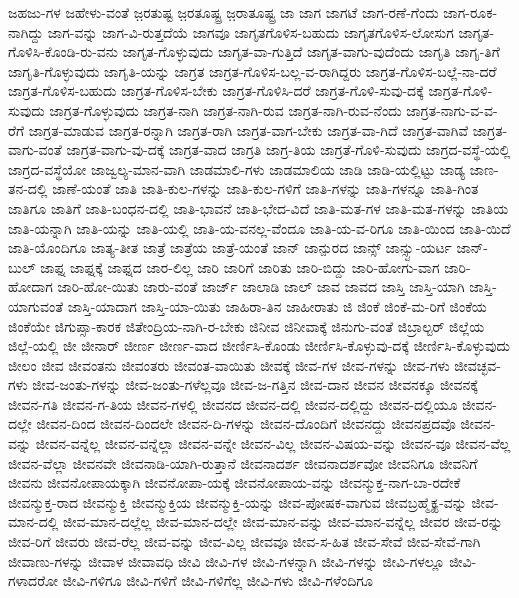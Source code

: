 {ಜಹಜು-ಗಳ
ಜಹೇಳು-ವಂತೆ
ಜ಼ರತುಷ್ಟ
ಜ಼ರತೂಷ್ಟ್ರ
ಜ಼ರಾತೂಷ್ಟ್ರ
ಜಾ
ಜಾಗ
ಜಾಗಟೆ
ಜಾಗ-ರಣೆ-ಗೆಂದು
ಜಾಗ-ರೂಕ-ನಾಗಿದ್ದು
ಜಾಗ-ವನ್ನು
ಜಾಗ-ವಿ-ರುತ್ತದೆಯೆ
ಜಾಗವೂ
ಜಾಗೃತಗೊಳಿಸ-ಬಹುದು
ಜಾಗೃತಗೊಳಿಸ-ಲೋಸುಗ
ಜಾಗೃತ-ಗೊಳಿಸಿ-ಕೊಂಡಿ-ರು-ವನು
ಜಾಗೃತ-ಗೊಳ್ಳುವುದು
ಜಾಗೃತ-ವಾ-ಗುತ್ತಿದೆ
ಜಾಗೃತ-ವಾಗು-ವುದೆಂದು
ಜಾಗೃತಿ
ಜಾಗೃ-ತಿಗೆ
ಜಾಗೃತಿ-ಗೊಳ್ಳುವುದು
ಜಾಗೃತಿ-ಯನ್ನು
ಜಾಗ್ರತ
ಜಾಗ್ರತ-ಗೊಳಿಸ-ಬಲ್ಲ-ವ-ರಾಗಿದ್ದರು
ಜಾಗ್ರತ-ಗೊಳಿಸ-ಬಲ್ಲೆ-ನಾ-ದರೆ
ಜಾಗ್ರತ-ಗೊಳಿಸ-ಬಹುದು
ಜಾಗ್ರತ-ಗೊಳಿಸ-ಬೇಕು
ಜಾಗ್ರತ-ಗೊಳಿಸಿ-ದರೆ
ಜಾಗ್ರತ-ಗೊಳಿ-ಸುವು-ದಕ್ಕೆ
ಜಾಗ್ರತ-ಗೊಳಿ-ಸುವುದು
ಜಾಗ್ರತ-ಗೊಳ್ಳುವುದು
ಜಾಗ್ರತ-ನಾಗಿ
ಜಾಗ್ರತ-ನಾಗಿ-ರುವ
ಜಾಗ್ರತ-ನಾಗಿ-ರುವ-ನೆಂದು
ಜಾಗ್ರತ-ನಾಗು-ವ-ವ-ರೆಗೆ
ಜಾಗ್ರತ-ಮಾಡುವ
ಜಾಗ್ರತ-ರನ್ನಾಗಿ
ಜಾಗ್ರತ-ರಾಗಿ
ಜಾಗ್ರತ-ವಾಗ-ಬೇಕು
ಜಾಗ್ರತ-ವಾ-ಗಿದೆ
ಜಾಗ್ರತ-ವಾಗಿವೆ
ಜಾಗ್ರತ-ವಾಗು-ವಂತೆ
ಜಾಗ್ರತ-ವಾಗು-ವು-ದಕ್ಕೆ
ಜಾಗ್ರತ-ವಾದ
ಜಾಗ್ರತಿ
ಜಾಗ್ರ-ತಿಯ
ಜಾಗ್ರತೆ-ಗೊಳಿ-ಸುವುದು
ಜಾಗ್ರದ-ವಸ್ಥೆ-ಯಲ್ಲಿ
ಜಾಗ್ರದ-ವಸ್ಥೆಯೋ
ಜಾಜ್ವಲ್ಯ-ಮಾನ-ವಾಗಿ
ಜಾಡಮಾಲಿ-ಗಳು
ಜಾಡಮಾಲಿಯ
ಜಾಡಿ
ಜಾಡಿ-ಯಲ್ಲಿಟ್ಟು
ಜಾಡ್ಯ
ಜಾಣ-ತನ-ದಲ್ಲಿ
ಜಾಣೆ-ಯಂತೆ
ಜಾತಿ
ಜಾತಿ-ಕುಲ-ಗಳನ್ನು
ಜಾತಿ-ಕುಲ-ಗಳಿಗೆ
ಜಾತಿ-ಗಳನ್ನು
ಜಾತಿ-ಗಳನ್ನೂ
ಜಾತಿ-ಗಿಂತ
ಜಾತಿಗೂ
ಜಾತಿಗೆ
ಜಾತಿ-ಬಂಧನ-ದಲ್ಲಿ
ಜಾತಿ-ಭಾವನೆ
ಜಾತಿ-ಭೇದ-ವಿದೆ
ಜಾತಿ-ಮತ-ಗಳ
ಜಾತಿ-ಮತ-ಗಳನ್ನು
ಜಾತಿಯ
ಜಾತಿ-ಯನ್ನಾಗಿ
ಜಾತಿ-ಯನ್ನು
ಜಾತಿ-ಯಲ್ಲಿ
ಜಾತಿ-ಯ-ವನಲ್ಲ-ವೆಂದೂ
ಜಾತಿ-ಯ-ವ-ರಿಗೂ
ಜಾತಿ-ಯಿಂದ
ಜಾತಿ-ಯಿದೆ
ಜಾತಿ-ಯೊಂದಿಗೂ
ಜಾತ್ಯ-ತೀತ
ಜಾತ್ರೆ
ಜಾತ್ರೆಯ
ಜಾತ್ರೆ-ಯಂತೆ
ಜಾನ್
ಜಾನ್ಪುರದ
ಜಾನ್ಸ್
ಜಾನ್ಸ್ಟು-ಯರ್ಟ
ಜಾನ್-ಬುಲ್
ಜಾಫ್ನ
ಜಾಫ್ನಕ್ಕೆ
ಜಾಫ್ನದ
ಜಾರ-ಲಿಲ್ಲ
ಜಾರಿ
ಜಾರಿಗೆ
ಜಾರಿತು
ಜಾರಿ-ಬಿದ್ದು
ಜಾರಿ-ಹೋಗು-ವಾಗ
ಜಾರಿ-ಹೋದಾಗ
ಜಾರಿ-ಹೋ-ಯಿತು
ಜಾರು-ವಂತೆ
ಜಾರ್ಜ್
ಜಾಲಾಡಿ
ಜಾಲ್
ಜಾವ
ಜಾವದ
ಜಾಸ್ತಿ
ಜಾಸ್ತಿ-ಯಾಗಿ
ಜಾಸ್ತಿ-ಯಾಗುವಂತೆ
ಜಾಸ್ತಿ-ಯಾದಾಗ
ಜಾಸ್ತಿ-ಯಾ-ಯಿತು
ಜಾಹಿರಾ-ತಿನ
ಜಾಹೀರಾತು
ಜಿ
ಜಿಂಕೆ
ಜಿಂಕೆ-ಮ-ರಿಗೆ
ಜಿಂಕೆಯ
ಜಿಂಕೆಯೇ
ಜಿಗುಪ್ಸಾ-ಕಾರಕ
ಜಿತೇಂದ್ರಿಯ-ನಾಗಿ-ರ-ಬೇಕು
ಜಿನೀವ
ಜಿನೀವಾಕ್ಕೆ
ಜಿನುಗು-ವಂತೆ
ಜಿಬ್ರಾಲ್ಟರ್
ಜಿಲ್ಲೆಯ
ಜಿಲ್ಲೆ-ಯಲ್ಲಿ
ಜೀ
ಜೀನಾರ್
ಜೀರ್ಣ
ಜೀರ್ಣ-ವಾದ
ಜೀರ್ಣಿಸಿ-ಕೊಂಡು
ಜೀರ್ಣಿಸಿ-ಕೊಳ್ಳುವು-ದಕ್ಕೆ
ಜೀರ್ಣಿಸಿ-ಕೊಳ್ಳುವುದು
ಜೀಲಂ
ಜೀವ
ಜೀವಂತನು
ಜೀವಂತರು
ಜೀವಂತ-ವಾಯಿತು
ಜೀವಕ್ಕೆ
ಜೀವ-ಗಳ
ಜೀವ-ಗಳನ್ನು
ಜೀವ-ಗಳು
ಜೀವಚ್ಛವ-ಗಳು
ಜೀವ-ಜಂತು-ಗಳನ್ನು
ಜೀವ-ಜಂತು-ಗಳೆಲ್ಲವೂ
ಜೀವ-ಜ-ಗತ್ತಿನ
ಜೀವ-ದಾನ
ಜೀವನ
ಜೀವನಕ್ಕೂ
ಜೀವನಕ್ಕೆ
ಜೀವನ-ಗತಿ
ಜೀವನ-ಗ-ತಿಯ
ಜೀವನ-ಗಳಲ್ಲಿ
ಜೀವನದ
ಜೀವನ-ದಲ್ಲಿ
ಜೀವನ-ದಲ್ಲಿದ್ದು
ಜೀವನ-ದಲ್ಲಿಯೂ
ಜೀವನ-ದಲ್ಲೇ
ಜೀವನ-ದಿಂದ
ಜೀವನ-ದಿಂದಲೇ
ಜೀವನ-ದಿ-ಗಳನ್ನು
ಜೀವನ-ದೊಂದಿಗೆ
ಜೀವನದ್ದು
ಜೀವನಪ್ರದವೊ
ಜೀವನ-ವನ್ನು
ಜೀವನ-ವನ್ನೆಲ್ಲ
ಜೀವನ-ವನ್ನೆಲ್ಲಾ
ಜೀವನ-ವನ್ನೇ
ಜೀವನ-ವಿಲ್ಲ
ಜೀವನ-ವಿಷಯ-ವನ್ನು
ಜೀವನ-ವೂ
ಜೀವನ-ವೆಲ್ಲ
ಜೀವನ-ವೆಲ್ಲಾ
ಜೀವನವೇ
ಜೀವನಾಡಿ-ಯಾಗಿ-ರುತ್ತಾನೆ
ಜೀವನಾದರ್ಶ
ಜೀವನಾದರ್ಶವೋ
ಜೀವನಿಗೂ
ಜೀವನಿಗೆ
ಜೀವನು
ಜೀವನೋಪಾಯಕ್ಕಾಗಿ
ಜೀವನೋಪಾ-ಯಕ್ಕೆ
ಜೀವನೋಪಾಯ-ವನ್ನು
ಜೀವನ್ಮುಕ್ತ-ನಾಗ-ಬಾ-ರದೇಕೆ
ಜೀವನ್ಮುಕ್ತ-ರಾದ
ಜೀವನ್ಮುಕ್ತಿ
ಜೀವನ್ಮುಕ್ತಿಯ
ಜೀವನ್ಮುಕ್ತಿ-ಯನ್ನು
ಜೀವ-ಪೋಷಕ-ವಾಗುವ
ಜೀವಬ್ರಹ್ಮೈಕ್ಯ-ವನ್ನು
ಜೀವ-ಮಾನ-ದಲ್ಲಿ
ಜೀವ-ಮಾನ-ದಲ್ಲೆಲ್ಲ
ಜೀವ-ಮಾನ-ದಲ್ಲೇ
ಜೀವ-ಮಾನ-ವನ್ನು
ಜೀವ-ಮಾನ-ವನ್ನೆಲ್ಲ
ಜೀವರ
ಜೀವ-ರನ್ನು
ಜೀವ-ರಿಗೆ
ಜೀವರು
ಜೀವ-ರೆಲ್ಲ
ಜೀವ-ವನ್ನು
ಜೀವ-ವಿಲ್ಲ
ಜೀವವೂ
ಜೀವ-ಸ-ಹಿತ
ಜೀವ-ಸೇವೆ
ಜೀವ-ಸೇವೆ-ಗಾಗಿ
ಜೀವಾಣು-ಗಳನ್ನು
ಜೀವಾಳ
ಜೀವಾವಧಿ
ಜೀವಿ
ಜೀವಿ-ಗಳ
ಜೀವಿ-ಗಳನ್ನಾಗಿ
ಜೀವಿ-ಗಳನ್ನು
ಜೀವಿ-ಗಳಲ್ಲೂ
ಜೀವಿ-ಗಳಾದರೋ
ಜೀವಿ-ಗಳಿಗೂ
ಜೀವಿ-ಗಳಿಗೆ
ಜೀವಿ-ಗಳಿಗೆಲ್ಲ
ಜೀವಿ-ಗಳು
ಜೀವಿ-ಗಳೆಂದಿಗೂ
}
